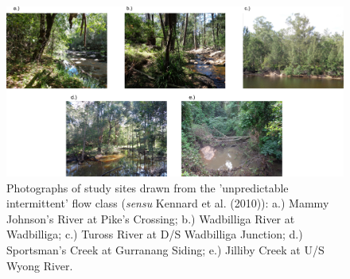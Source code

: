 \begin{landscape}
\begin{figure}[h!]
\begin{center}
\includegraphics[width=20cm]{site_photos_3.pdf} %
\caption[Photographs of study sites drawn from the 'unpredictable intermittent' flow class.]{\small{Photographs of study sites drawn from the 'unpredictable intermittent' flow class (\textit{sensu} Kennard et al. (2010)): a.) Mammy Johnson's River at Pike's Crossing; b.) Wadbilliga River at Wadbilliga; c.) Tuross River at D/S Wadbilliga Junction; d.) Sportsman's Creek at Gurranang Siding; e.) Jilliby Creek at U/S Wyong River.}} %
\label{fig:biophysical_supp_F5} %
\end{center}
\end{figure}   
\end{landscape}
\clearpage









